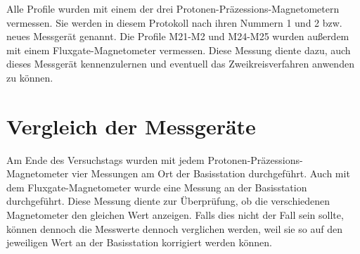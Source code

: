 Alle Profile wurden mit einem der drei Protonen-Präzessions-Magnetometern vermessen. Sie werden in diesem Protokoll nach ihren Nummern 1 und 2 bzw. neues Messgerät genannt. Die Profile M21-M2 und M24-M25 wurden außerdem mit einem Fluxgate-Magnetometer vermessen. Diese Messung diente dazu, auch dieses Messgerät kennenzulernen und eventuell das Zweikreisverfahren anwenden zu können.

\section{Vergleich der Messgeräte}

Am Ende des Versuchstags wurden mit jedem Protonen-Präzessions-Magnetometer vier Messungen am Ort der Basisstation durchgeführt. Auch mit dem Fluxgate-Magnetometer wurde eine Messung an der Basisstation durchgeführt. Diese Messung diente zur Überprüfung, ob die verschiedenen Magnetometer den gleichen Wert anzeigen. Falls dies nicht der Fall sein sollte, können dennoch die Messwerte dennoch verglichen werden, weil sie so auf den jeweiligen Wert an der Basisstation korrigiert werden können.